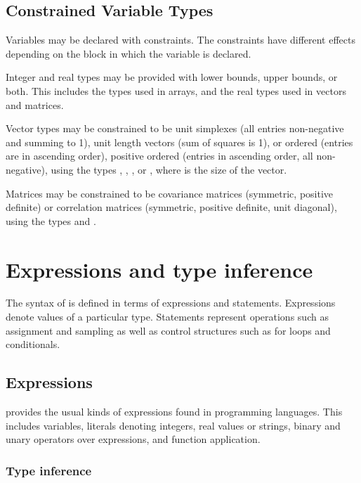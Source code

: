 \documentclass[article]{jss}
\begin{document}
\subsection{Constrained Variable Types}

Variables may be declared with constraints.  The constraints have
different effects depending on the block in which the variable is
declared.

Integer and real types may be provided with lower bounds, upper
bounds, or both.  This includes the types used in arrays, and the real
types used in vectors and matrices.

Vector types may be constrained to be unit simplexes (all entries
non-negative and summing to 1), unit length vectors (sum of squares is 1), or
ordered (entries are in ascending order), positive ordered (entries in
ascending order, all non-negative), using the types ,
, , or
, where  is the size of the vector.

Matrices may be constrained to be covariance matrices (symmetric,
positive definite) or correlation matrices (symmetric, positive
definite, unit diagonal), using the types  and
.

\section{Expressions and type inference}

The syntax of  is defined in terms of expressions and
statements.  Expressions denote values of a particular type.  
Statements represent operations such as assignment and sampling as
well as control structures such as for loops and conditionals.

\subsection{Expressions}

 provides the usual kinds of expressions found in
programming languages.  This includes variables, literals denoting
integers, real values or strings, binary and unary operators over
expressions, and function application.  

\subsubsection{Type inference}
\end{document}
